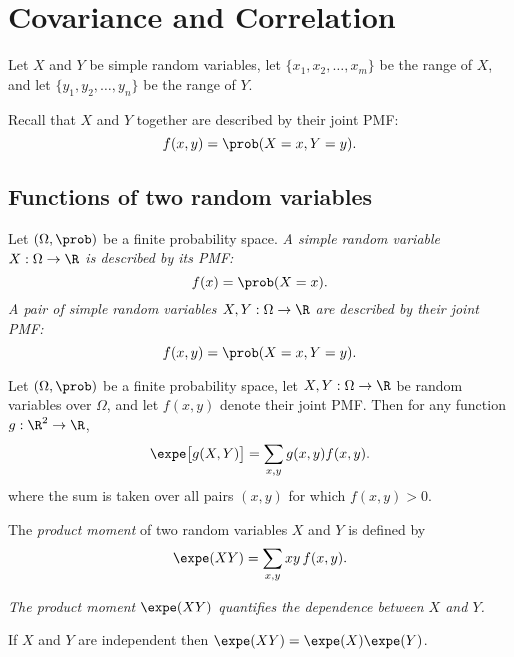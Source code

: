 \chapter{Covariance and Correlation}\label{chap:covar}

Let $X$ and $Y$ be simple random variables, let $\{x_1,x_2,\ldots,x_m\}$ be the range of $X$, and let $\{y_1,y_2,\ldots,y_n\}$ be the range of $Y$.

Recall that $X$ and $Y$ together are described by their joint PMF:
\[
f(x,y) = \prob(X=x,Y=y).
\]

\section{Functions of two random variables}
Let $(\Omega,\prob)$ be a finite probability space.
\bit
\it A simple random variable $X:\Omega\to\R$ is described by its PMF:
\[
f(x) = \prob(X=x).
\]
\it A pair of simple random variables $X,Y:\Omega\to\R$ are described by their joint PMF:
\[
f(x,y) = \prob(X=x,Y=y).
\]
\eit

\begin{lemma}\label{lem:lus2}
Let $(\Omega,\prob)$ be a finite probability space, let $X,Y:\Omega\to\R$ be random variables over $\Omega$, and let $f(x,y)$ denote their joint PMF. Then for any function $g:\R^2\to\R$,
\[
\expe\big[g(X,Y)\big] = \sum_{x,y} g(x,y)f(x,y).
\]
where the sum is taken over all pairs $(x,y)$ for which $f(x,y)>0$.
\end{lemma}
\proofomitted

\break %


\begin{definition}
The \emph{product moment} of two random variables $X$ and $Y$ is defined by
\[
\expe(XY) = \sum_{x,y} xy\,f(x,y).
\]
\end{definition}

\bit
\it The product moment $\expe(XY)$ quantifies the \emph{dependence} between $X$ and $Y$.
\eit

\begin{lemma}\label{lem:independent_implies_uncorrelated}
If $X$ and $Y$ are independent then $\expe(XY)=\expe(X)\expe(Y)$.
\end{lemma}

